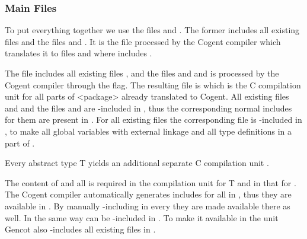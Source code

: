 \subsubsection{Main Files}

To put everything together we use the files  and . The former includes all 
existing  files and the files  and .
It is the file processed by the Cogent compiler which translates it to files  
and  where  includes . 

The file  includes all existing files 
, and the files  and  and is processed by the Cogent compiler through the 
 flag. The resulting file is  which is the C compilation unit for 
all parts of <package> already translated to Cogent. All existing files  and  
and the files  and  are 
-included in , thus the corresponding normal includes for them are present in 
.
For all existing files  the corresponding file  is -included in 
, to make all global variables with external linkage and all type definitions in  
a part of .

Every abstract type T yields an additional separate C compilation unit . 

The content of  and all  is required in the compilation unit for T and in 
that for . The Cogent compiler automatically generates includes for all  in 
, 
thus they are available in . By manually -including  in every 
 they are made available there as well. In the same way  can be -included
in . To make it available in the  unit Gencot also -includes all 
existing  files in .

 
